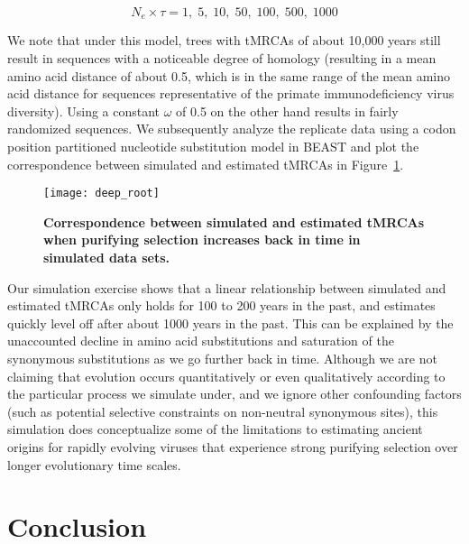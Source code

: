 \begin{equation}
N_{e} \times \tau=1,\; 5,\; 10,\; 50,\; 100,\; 500,\; 1000
\label{eq:gener_times}
\end{equation}

We note that under this model, trees with tMRCAs of about 10,000 years still result in sequences with a noticeable degree of homology (resulting in a mean amino acid distance of about 0.5, which is in the same range of the mean amino acid distance for sequences representative of the primate immunodeficiency virus diversity).
Using a constant $\omega$ of 0.5 on the other hand results in fairly randomized sequences.
We subsequently analyze the replicate data using a codon position partitioned nucleotide substitution model in BEAST and plot the correspondence between simulated and estimated tMRCAs in Figure~\ref{fig:deep_root}.

\begin{figure}[h!]
\centering
\texttt{[image: deep\_root]} 
\caption{
{ \footnotesize
{\bf Correspondence between simulated and estimated tMRCAs when purifying selection increases back in time in simulated data sets.} 
}%
}
\label{fig:deep_root}
\end{figure}

Our simulation exercise shows that a linear relationship between simulated and estimated tMRCAs only holds for 100 to 200 years in the past, and estimates quickly level off after about 1000 years in the past.
This can be explained by the unaccounted decline in amino acid substitutions and saturation of the synonymous substitutions as we go further back in time.
Although we are not claiming that evolution occurs quantitatively or even qualitatively according to the particular process we simulate under, and we ignore other confounding factors (such as potential selective constraints on non-neutral synonymous sites), this simulation does conceptualize some of the limitations to estimating ancient origins for rapidly evolving viruses that experience strong purifying selection over longer evolutionary time scales.

\section{Conclusion}

